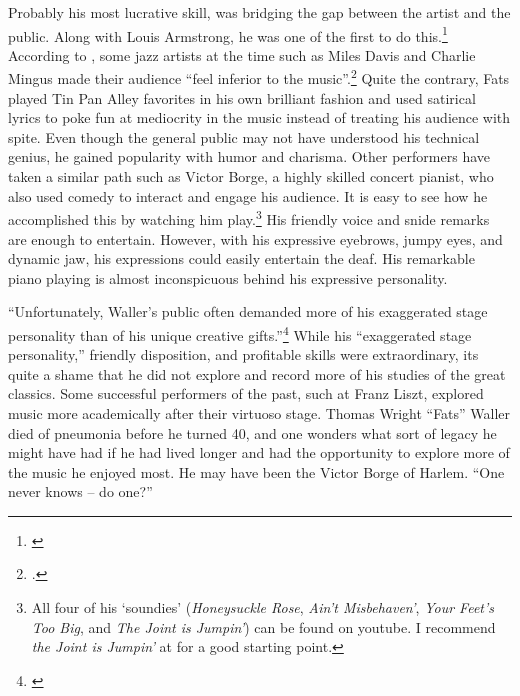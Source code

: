\documentclass[11pt]{report}
\begin{document}
	\label{sec:charisma}
	Probably his most lucrative skill, was bridging the gap between the artist and the public. Along with Louis Armstrong, he was one of the first to do this.\footnote{\cite[3]{life}} According to \citeauthor{outside-insider}, some jazz artists at the time such as Miles Davis and Charlie Mingus made their audience ``feel inferior to the music''.\footnote{\cite[16]{outside-insider}.} Quite the contrary, Fats played Tin Pan Alley favorites in his own brilliant fashion and used satirical lyrics to poke fun at mediocrity in the music instead of treating his audience with spite. Even though the general public may not have understood his technical genius, he gained popularity with humor and charisma. Other performers have taken a similar path such as Victor Borge, a highly skilled concert pianist, who also used comedy to interact and engage his audience.
	It is easy to see how he accomplished this by watching him play.\footnote{All four of his `soundies' (\emph{Honeysuckle Rose}, \emph{Ain't Misbehaven'}, \emph{Your Feet's Too Big}, and \emph{The Joint is Jumpin'}) can be found on youtube. I recommend \emph{the Joint is Jumpin'} at  for a good starting point.} His friendly voice and snide remarks are enough to entertain. However, with his expressive eyebrows, jumpy eyes, and dynamic jaw, his expressions could easily entertain the deaf. His remarkable piano playing is almost inconspicuous behind his expressive personality.


	\label{sec:conclusion}

	``Unfortunately, Waller's public often demanded more of his exaggerated stage personality than of his unique creative gifts.''\footnote{\cite[40]{grove-book:waller}} While his ``exaggerated stage personality,'' friendly disposition, and profitable skills were extraordinary, its quite a shame that he did not explore and record more of his studies of the great classics. Some successful performers of the past, such at Franz Liszt, explored music more academically after their virtuoso stage. Thomas Wright ``Fats'' Waller died of pneumonia before he turned 40, and one wonders what sort of legacy he might have had if he had lived longer and had the opportunity to explore more of the music he enjoyed most. He may have been the Victor Borge of Harlem. ``One never knows -- do one?''



		\nocite{anecdotes}
		\nocite{experience}
		\nocite{grove-book:waller}
		\nocite{jazz_scene}
		\nocite{life}
		\nocite{modernism}
		\nocite{outside-insider}
		\nocite{transcriptions}
		\nocite{visions}
		\nocite{web:machlin}
		\nocite{web:stride}
		\nocite{youtube-joint_is_jumpin}
			\printbibliography
\end{document}
